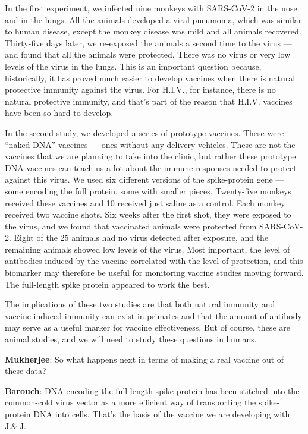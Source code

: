 In the first experiment, we infected nine monkeys with SARS-CoV-2 in the
nose and in the lungs. All the animals developed a viral pneumonia,
which was similar to human disease, except the monkey disease was mild
and all animals recovered. Thirty-five days later, we re-exposed the
animals a second time to the virus --- and found that all the animals
were protected. There was no virus or very low levels of the virus in
the lungs. This is an important question because, historically, it has
proved much easier to develop vaccines when there is natural protective
immunity against the virus. For H.I.V., for instance, there is no
natural protective immunity, and that's part of the reason that H.I.V.
vaccines have been so hard to develop.

In the second study, we developed a series of prototype vaccines. These
were ``naked DNA'' vaccines --- ones without any delivery vehicles.
These are not the vaccines that we are planning to take into the clinic,
but rather these prototype DNA vaccines can teach us a lot about the
immune responses needed to protect against this virus. We used six
different versions of the spike-protein gene --- some encoding the full
protein, some with smaller pieces. Twenty-five monkeys received these
vaccines and 10 received just saline as a control. Each monkey received
two vaccine shots. Six weeks after the first shot, they were exposed to
the virus, and we found that vaccinated animals were protected from
SARS-CoV-2. Eight of the 25 animals had no virus detected after
exposure, and the remaining animals showed low levels of the virus. Most
important, the level of antibodies induced by the vaccine correlated
with the level of protection, and this biomarker may therefore be useful
for monitoring vaccine studies moving forward. The full-length spike
protein appeared to work the best.

The implications of these two studies are that both natural immunity and
vaccine-induced immunity can exist in primates and that the amount of
antibody may serve as a useful marker for vaccine effectiveness. But of
course, these are animal studies, and we will need to study these
questions in humans.

\textbf{Mukherjee}: So what happens next in terms of making a real
vaccine out of these data?

\textbf{Barouch}: DNA encoding the full-length spike protein has been
stitched into the common-cold virus vector as a more efficient way of
transporting the spike-protein DNA into cells. That's the basis of the
vaccine we are developing with J.\& J.

